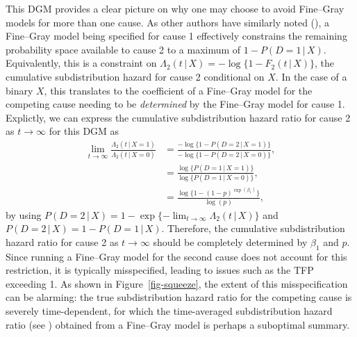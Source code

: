 \documentclass[
  letterpaper,
  DIV=11,
  numbers=noendperiod]{scrreprt}
\newcommand{\given}{\,|\,}
\begin{document}
This DGM provides a clear picture on why one may choose to avoid
Fine--Gray models for more than one cause. As other authors have
similarly noted
(), a Fine--Gray model being specified for cause 1
effectively constrains the remaining probability space available to
cause 2 to a maximum of \(1 - P(D = 1 \given X)\). Equivalently, this is
a constraint on
\(\Lambda_2(t \given X) = -\log\{1 - F_2(t \given X)\}\), the cumulative
subdistribution hazard for cause 2 conditional on \(X\). In the case of
a binary \(X\), this translates to the coefficient of a Fine--Gray model
for the competing cause needing to be \textit{determined} by the
Fine--Gray model for cause 1. Explictly, we can express the cumulative
subdistribution hazard ratio for cause 2 as \(t \to \infty\) for this
DGM as \begin{align*}
    \lim_{t \to \infty} \frac{\Lambda_{2}(t \given X = 1)}{\Lambda_{2}(t \given X = 0)} &= \frac{-\log\{1 - P(D = 2 \given X = 1)\}}{-\log\{1 - P(D = 2 \given X = 0)\}} ,\\
    &= \frac{\log \{P(D = 1 \given X = 1)\}}{\log \{P(D = 1 \given X = 0)\}}, \\
    &= \frac{\log \{1 - (1-p)^{\exp(\beta_1)}\}}{\log(p)},
\end{align*} by using
\(P(D = 2 \given X) = 1 - \exp\{-  \lim_{t \to \infty} \Lambda_2(t \given X)\}\)
and \(P(D = 2 \given X) = 1 - P(D = 1 \given X)\). Therefore, the
cumulative subdistribution hazard ratio for cause 2 as \(t \to \infty\)
should be completely determined by \(\beta_1\) and \(p\). Since running
a Fine--Gray model for the second cause does not account for this
restriction, it is typically misspecified, leading to issues such as the
TFP exceeding 1. As shown in Figure~\ref{fig-squeeze}, the extent of
this misspecification can be alarming: the true subdistribution hazard
ratio for the competing cause is severely time-dependent, for which the
time-averaged subdistribution hazard ratio (see
) obtained from a Fine--Gray model is perhaps a
suboptimal summary.
\end{document}
